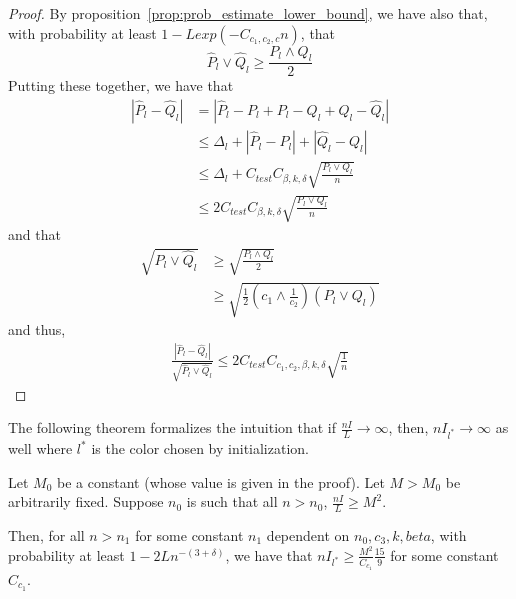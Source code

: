 \documentclass{article}
\begin{document}
\begin{proof}
By proposition~\ref{prop:prob_estimate_lower_bound}, we have also that, with probability at least $1 - L exp(- C_{c_1, c_2, c} n)$, that
\[
\hat{P}_l \vee \hat{Q}_l \geq \frac{P_l \wedge Q_l}{2}
\]
Putting these together, we have that
\begin{align*}
|\hat{P}_l - \hat{Q}_l| &= | \hat{P}_l - P_l + P_l - Q_l + Q_l - \hat{Q}_l| \\
    &\leq \Delta_l + | \hat{P}_l - P_l| + |\hat{Q}_l - Q_l| \\
    &\leq \Delta_l + C_{test} C_{\beta, k, \delta} \sqrt{ \frac{P_l \vee Q_l}{n} } \\
    &\leq 2 C_{test} C_{\beta, k, \delta} \sqrt{ \frac{P_l \vee Q_l}{n} }
\end{align*}
and that
\begin{align*}
\sqrt{\hat{P}_l \vee \hat{Q}_l} &\geq \sqrt{\frac{P_l \wedge Q_l}{2}} \\
                 &\geq \sqrt{\frac{1}{2} (c_1 \wedge \frac{1}{c_2} ) (P_l \vee Q_l)} 
\end{align*} 
and thus,
\begin{align*}
\frac{| \hat{P}_l - \hat{Q}_l| }{\sqrt{ \hat{P}_l \vee \hat{Q}_l} } \leq 2 C_{test} C_{c_1, c_2, \beta, k, \delta} \sqrt{ \frac{1}{n} }
\end{align*}

\end{proof}

The following theorem formalizes the intuition that if $\frac{n I}{L} \rightarrow \infty$, then, $ n I_{l^*} \rightarrow \infty$ as well where $l^*$ is the color chosen by initialization. 

\begin{theorem}
Let $M_0$ be a constant (whose value is given in the proof). Let $M > M_0$ be arbitrarily fixed. Suppose $n_0$ is such that all $n > n_0$, $\frac{n I}{L} \geq M^2$.

Then, for all $n > n_1$ for some constant $n_1$ dependent on $n_0, c_3, k, beta$, with probability at least $1 - 2L n^{-(3+\delta)}$, we have that $n I_{l^*} \geq \frac{M^2}{C_{c_1}} \frac{15}{9}$ for some constant $C_{c_1}$. 
\end{theorem}
\end{document}
